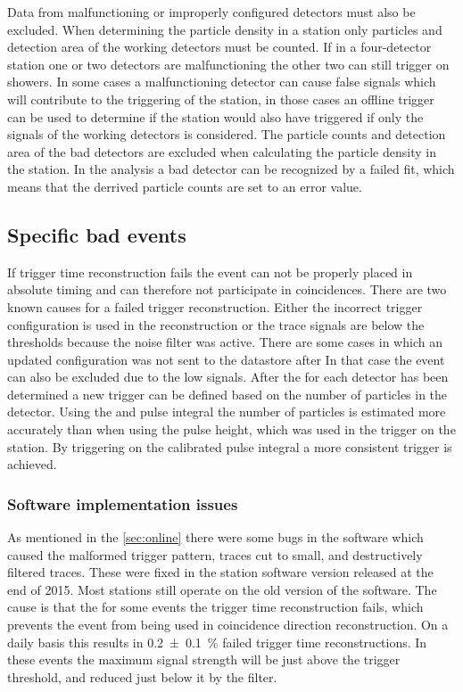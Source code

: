 Data from malfunctioning or improperly configured detectors must also be excluded. When determining the particle density in a station only particles and detection area of the working detectors must be counted. If in a four-detector station one or two detectors are malfunctioning the other two can still trigger on showers. In some cases a malfunctioning detector can cause false signals which will contribute to the triggering of the station, in those cases an offline trigger can be used to determine if the station would also have triggered if only the signals of the working detectors is considered. The particle counts and detection area of the bad detectors are excluded when calculating the particle density in the station. In the analysis a bad detector can be recognized by a failed \mpv fit, which means that the derrived particle counts are set to an error value.


\subsection{Specific bad events}

If trigger time reconstruction fails the event can not be properly placed in absolute \gps timing and can therefore not participate in coincidences. There are two known causes for a failed trigger reconstruction. Either the incorrect trigger configuration is used in the reconstruction or the trace signals are below the thresholds because the noise filter was active. There are some cases in which an updated configuration was not sent to the datastore after In that case the event can also be excluded due to the low signals. After the \mpv for each detector has been determined a new trigger can be defined based on the number of particles in the detector. Using the \mpv and pulse integral the number of particles is estimated more accurately than when using the pulse height, which was used in the trigger on the station. By triggering on the calibrated pulse integral a more consistent trigger is achieved.



\subsubsection{Software implementation issues}

As mentioned in the \cref{sec:online} there were some bugs in the software which caused the malformed trigger pattern, traces cut to small, and destructively filtered traces. These were fixed in the \hisparc station software version released at the end of 2015. Most stations still operate on the old version of the software. The cause is that the for some events the trigger time reconstruction fails, which prevents the event from being used in coincidence direction reconstruction. On a daily basis this results in \SI{0.2 \pm 0.1}{\percent} failed trigger time reconstructions. In these events the maximum signal strength will be just above the trigger threshold, and reduced just below it by the filter.
